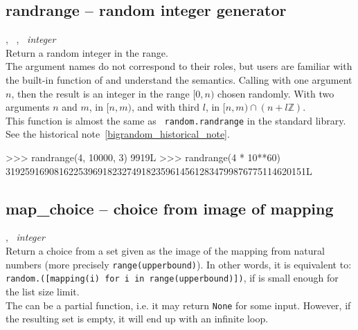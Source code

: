   \subsection{randrange -- random integer generator}
   {%
     ,\ %
     ,\ %
   }{%
     {\em integer}
   }\\
   \spacing
   \quad Return a random integer in the range.\\
   \spacing
   \quad The argument names do not correspond to their roles, but
   users are familiar with the
    built-in function of
   \python and understand the semantics.  Calling with one argument
   \(n\), then the result is an integer in the range \([0, n)\) chosen
   randomly.  With two arguments \(n\) and \(m\),
   in \([n, m)\), and with third \(l\), in \([n, m) \cap (n + l\mathbb{Z})\).\\
   \spacing \quad This function is almost the same as {\tt
     random.randrange} in the \python standard library.  See the
   historical note~\ref{bigrandom_historical_note}.
%
\begin{ex}
>>> randrange(4, 10000, 3)
9919L
>>> randrange(4 * 10**60)
31925916908162253969182327491823596145612834799876775114620151L
\end{ex}%

   \subsection{map\_choice -- choice from image of mapping}
   {%
     ,\ %
   }{%
     {\em integer}
   }\\
   \spacing
   \quad Return a choice from a set given as the image of the mapping
   from natural numbers (more precisely {\tt range(upperbound)}).  In
   other words, it is equivalent to:
   {\tt random.([mapping(i) for i in range(upperbound)])},
   if  is small enough for the list size limit.\\
   \spacing
   \quad The  can be a partial function, i.e. it may return
   {\tt None} for some input. However, if the resulting set is empty, it
   will end up with an infinite loop.\\
\C



